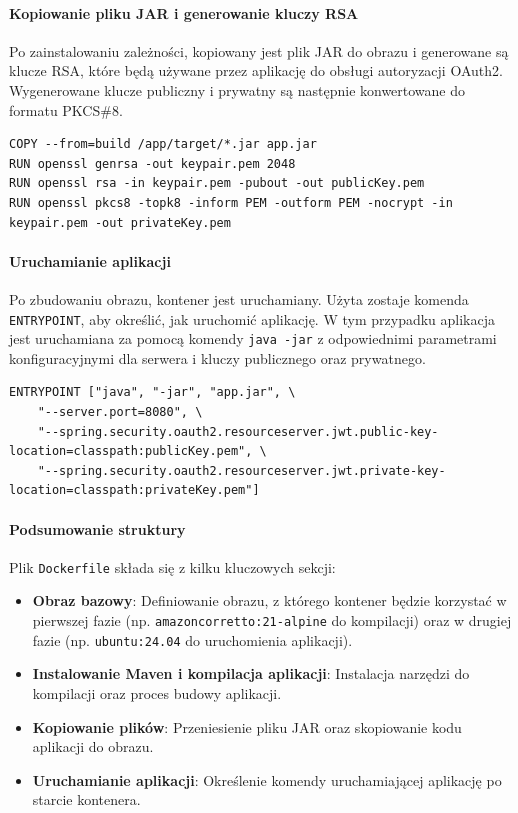 \paragraph{Kopiowanie pliku JAR i generowanie kluczy RSA}
Po zainstalowaniu zależności, kopiowany jest plik JAR do obrazu i generowane są klucze RSA, które będą używane przez aplikację do obsługi autoryzacji OAuth2. Wygenerowane klucze publiczny i prywatny są następnie konwertowane do formatu PKCS\#8.
\begin{lstlisting}[basicstyle=\footnotesize\ttfamily]
COPY --from=build /app/target/*.jar app.jar
RUN openssl genrsa -out keypair.pem 2048
RUN openssl rsa -in keypair.pem -pubout -out publicKey.pem
RUN openssl pkcs8 -topk8 -inform PEM -outform PEM -nocrypt -in keypair.pem -out privateKey.pem
\end{lstlisting}

\paragraph{Uruchamianie aplikacji}
Po zbudowaniu obrazu, kontener jest uruchamiany. Użyta zostaje komenda \texttt{ENTRYPOINT}, aby określić, jak uruchomić aplikację. W tym przypadku aplikacja jest uruchamiana za pomocą komendy \texttt{java -jar} z odpowiednimi parametrami konfiguracyjnymi dla serwera i kluczy publicznego oraz prywatnego.
\begin{lstlisting}[basicstyle=\footnotesize\ttfamily]
ENTRYPOINT ["java", "-jar", "app.jar", \
    "--server.port=8080", \
    "--spring.security.oauth2.resourceserver.jwt.public-key-location=classpath:publicKey.pem", \
    "--spring.security.oauth2.resourceserver.jwt.private-key-location=classpath:privateKey.pem"]
\end{lstlisting}

\paragraph{Podsumowanie struktury}
Plik \texttt{Dockerfile} składa się z kilku kluczowych sekcji:
\begin{itemize}
    \item \textbf{Obraz bazowy}: Definiowanie obrazu, z którego kontener będzie korzystać w pierwszej fazie (np. \texttt{amazoncorretto:21-alpine} do kompilacji) oraz w drugiej fazie (np. \texttt{ubuntu:24.04} do uruchomienia aplikacji).
    \item \textbf{Instalowanie Maven i kompilacja aplikacji}: Instalacja narzędzi do kompilacji oraz proces budowy aplikacji.
    \item \textbf{Kopiowanie plików}: Przeniesienie pliku JAR oraz skopiowanie kodu aplikacji do obrazu.
    \item \textbf{Uruchamianie aplikacji}: Określenie komendy uruchamiającej aplikację po starcie kontenera.
\end{itemize}

